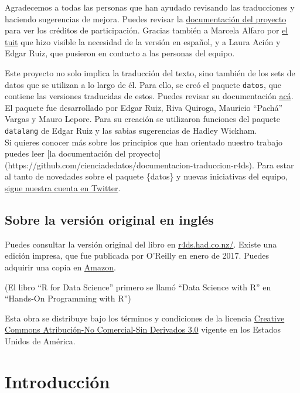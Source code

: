 \documentclass[11pt,oneside]{report}
\begin{document}
Agradecemos a todas las personas que han ayudado revisando las
traducciones y haciendo sugerencias de mejora. Puedes revisar la
\href{https://github.com/cienciadedatos/documentacion-traduccion-r4ds/blob/master/creditos-participacion.md}{documentación
del proyecto} para ver los créditos de participación. Gracias también a
Marcela Alfaro por
\href{https://twitter.com/Fichulina/status/943509009318981633}{el tuit}
que hizo visible la necesidad de la versión en español, y a Laura Ación
y Edgar Ruiz, que pusieron en contacto a las personas del equipo.

Este proyecto no solo implica la traducción del texto, sino también de
los sets de datos que se utilizan a lo largo de él. Para ello, se creó
el paquete \texttt{datos}, que contiene las versiones traducidas de
estos. Puedes revisar su documentación
\href{https://cienciadedatos.github.io/datos}{acá}. El paquete fue
desarrollado por Edgar Ruiz, Riva Quiroga, Mauricio ``Pachá'' Vargas y
Mauro Lepore. Para su creación se utilizaron funciones del paquete
\texttt{datalang} de Edgar Ruiz y las sabias sugerencias de Hadley
Wickham.\\
Si quieres conocer más sobre los principios que han orientado nuestro
trabajo puedes leer {[}la documentación del proyecto{]}
(https://github.com/cienciadedatos/documentacion-traduccion-r4ds). Para
estar al tanto de novedades sobre el paquete \{datos\} y nuevas
iniciativas del equipo, \href{https://twitter.com/R4DS_es}{sigue nuestra
cuenta en Twitter}.

\section*{Sobre la versión original en inglés}

Puedes consultar la versión original del libro en
\href{http://r4ds.had.co.nz/}{r4ds.had.co.nz/}. Existe una edición
impresa, que fue publicada por O'Reilly en enero de 2017. Puedes
adquirir una copia en \href{http://amzn.to/2aHLAQ1}{Amazon}.

(El libro ``R for Data Science'' primero se llamó ``Data Science with
R'' en ``Hands-On Programming with R'')

Esta obra se distribuye bajo los términos y condiciones de la licencia
\href{http://creativecommons.org/licenses/by-nc-nd/3.0/us/}{Creative
Commons Atribución-No Comercial-Sin Derivados 3.0} vigente en los
Estados Unidos de América.

\hypertarget{introducciuxf3n}{%
\chapter{Introducción}\label{introducciuxf3n}}
\end{document}
